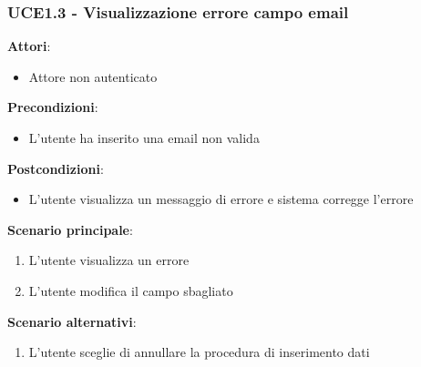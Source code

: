\subsubsection{UCE1.3 - Visualizzazione errore campo email}
\textbf{Attori}:
\begin{itemize}
    \item Attore non autenticato
\end{itemize}
\textbf{Precondizioni}:
\begin{itemize}
    \item L'utente ha inserito una email non valida
\end{itemize}
\textbf{Postcondizioni}:
\begin{itemize}
    \item L'utente visualizza un messaggio di errore e sistema corregge l'errore
\end{itemize}
\textbf{Scenario principale}:
\begin{enumerate}
    \item L'utente visualizza un errore 
    \item L'utente modifica il campo sbagliato
\end{enumerate}
\textbf{Scenario alternativi}:
\begin{enumerate}
    \item L'utente sceglie di annullare la procedura di inserimento dati
\end{enumerate}